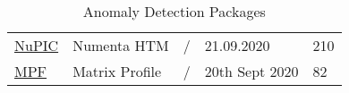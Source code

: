 \begin{table}[h]
{\begin{tabular}{lllll}
            \href{https://github.com/numenta/nupic}{NuPIC}                                                          & Numenta HTM                                                                                                                                                                                                                                                                                                                                                                                                                   & /         & 21.09.2020        & 210   \\\addlinespace
            \href{https://github.com/matrix-profile-foundation/matrixprofile}{MPF}                                  & Matrix Profile                                                                                                                                                                                                                                                                                                                                                                                                                & /         & 20th Sept 2020    & 82    \\
        \end{tabular}
    }
    \caption{Anomaly Detection Packages}\label{tab:ad-packages}
\end{table}




